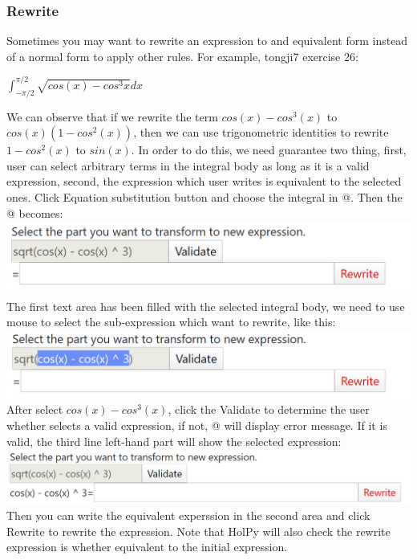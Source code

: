 \documentclass[titlepage]{article}
\makeatletter
\newcommand*{\rom}[1]{\expandafter\@slowromancap\romannumeral #1@}
\makeatother
\begin{document}
\subsubsection{Rewrite}
Sometimes you may want to rewrite an expression to and equivalent form instead of a normal form to apply other rules. For example, tongji7 exercise 26:
\begin{center}
$\int_{-\pi/2}^{\pi/2} \sqrt{cos(x) - cos^{3}x} dx$
\end{center}
We can observe that if we rewrite the term $cos(x) - cos^{3}(x)$ to $cos(x)(1 - cos^{2}(x))$, then we can use trigonometric identities to rewrite $1-cos^{2}(x)$ to $sin(x)$. In order to do this, we need guarantee two thing, first, user can select arbitrary terms in the integral body as long as it is a valid expression, second, the expression which user writes is equivalent to the selected ones. Click \colorbox{mygray}{Equation substitution} button and choose the integral in \rom{4}. Then the \rom{5} becomes:\\
\includegraphics{17.png}\\
The first text area has been filled with the selected integral body, we need to use mouse to select the sub-expression which want to rewrite, like this:\\
\includegraphics{18.png}\\
After select $cos(x) - cos^{3}(x)$, click the \colorbox{mygray}{Validate} to determine the user whether selects a valid expression, if not, \rom{5} will display error message. If it is valid, the third line left-hand part will show the selected expression:\\
\includegraphics{19.png}\\
Then you can write the equivalent experssion in the second area and click \colorbox{mygray}{Rewrite} to rewrite the expression. Note that HolPy will also check the rewrite expression is whether equivalent to the initial expression. \\
\end{document}
